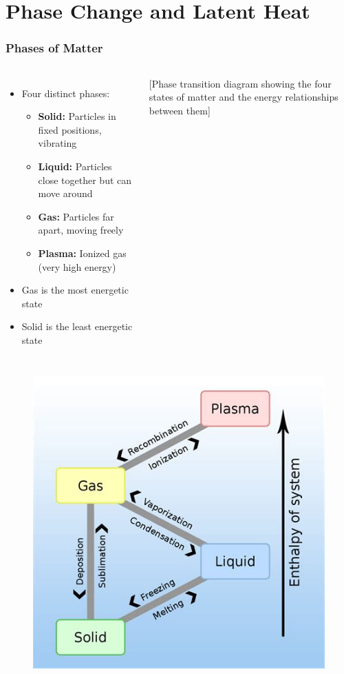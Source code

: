 \documentclass{beamer}
\begin{document}
\section{Phase Change and Latent Heat}

\begin{frame}
    \frametitle{Phases of Matter}
    \begin{columns}
        \begin{itemize}
            \item Four distinct phases:
            \begin{itemize}
                \item \textbf{Solid:} Particles in fixed positions, vibrating
                \item \textbf{Liquid:} Particles close together but can move around
                \item \textbf{Gas:} Particles far apart, moving freely
                \item \textbf{Plasma:} Ionized gas (very high energy)
            \end{itemize}
            \item Gas is the most energetic state
            \item Solid is the least energetic state
        \end{itemize}
        
        \begin{center}
            \alert{[Phase transition diagram showing the four states of matter and the energy relationships between them]}
        \end{center}
    \end{columns}
\end{frame}

\begin{frame}
\begin{figure}
    \centering
    \includegraphics[width=0.75\linewidth]{th-1470353042.jpg}
\end{figure}
\end{frame}
\end{document}

